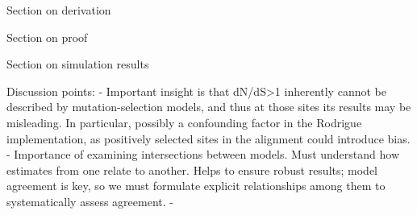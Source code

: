 \documentclass[11pt]{article}
\begin{document}
Section on derivation

Section on proof

Section on simulation results

Discussion points:
- Important insight is that dN/dS>1 inherently cannot be described by mutation-selection models, and thus at those sites its results may be misleading. In particular, possibly a confounding factor in the Rodrigue implementation, as positively selected sites in the alignment could introduce bias.
- Importance of examining intersections between models. Must understand how estimates from one relate to another. Helps to ensure robust results; model agreement is key, so we must formulate explicit relationships among them to systematically assess agreement.
- 
	
	
	
	
	
	
	
	
	
	
	

	
	
\end{document}
